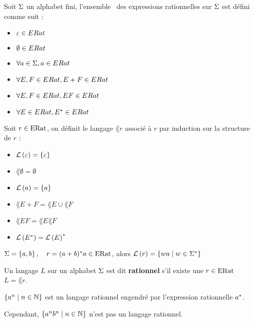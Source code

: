 \begin{definition}
	Soit $\Sigma$ un alphabet fini, l'ensemble \eratsym \ des expressions rationnelles sur $\Sigma$ est défini comme suit :
	\begin{itemize}
		\item $\varepsilon \in ERat$
		\item $\emptyset \in ERat$
		\item $\forall a \in \Sigma, a \in ERat$
		\item $\forall E, F \in ERat, E + F \in ERat$
		\item $\forall E, F \in ERat, EF \in ERat$
		\item $\forall E \in ERat, E^{*} \in ERat$
	\end{itemize}
\end{definition}

\begin{definition}
	Soit $r \in \text{ERat}$, on définit le langage $\lang r$ associé à $r$ par induction sur la structure de $r$ :
	\begin{itemize}
		\item $\mathcal{L}\left(\varepsilon\right) = \left\{\varepsilon\right\}$
		\item $\lang \emptyset = \emptyset$
		\item $\mathcal{L}\left(a\right) = \left\{a\right\}$
		\item $\lang {E + F} = \lang E \cup \lang F$
		\item $\lang {EF} = \lang E \lang F$
		\item $\mathcal{L}\left(E^{*}\right) = \mathcal{L}\left(E\right)^{*}$
	\end{itemize}
\end{definition}

\begin{exemple}
	$ \Sigma = \left\{a, b\right\}, \quad r = (a + b)^{*} a \in \text{ERat} $, alors
	$ \mathcal{L}\left(r\right) = \left\{wa \mid w \in \Sigma^{*}\right\} $
\end{exemple}


\begin{definition}
	Un langage $L$ sur un alphabet $\Sigma$ est dit \textbf{rationnel} s'il existe une \exprat $r \in \text{ERat}$ \tlq $L = \lang r$.

\end{definition}

\begin{exemple}
	$\left\{a^n \mid n \in \mathbb{N}\right\}$ est un langage rationnel engendré par l'expression rationnelle $a^{*}$.

	Cependant, $\left\{a^n b^n \mid n \in \mathbb{N}\right\}$ n'est pas un langage rationnel.
\end{exemple}


